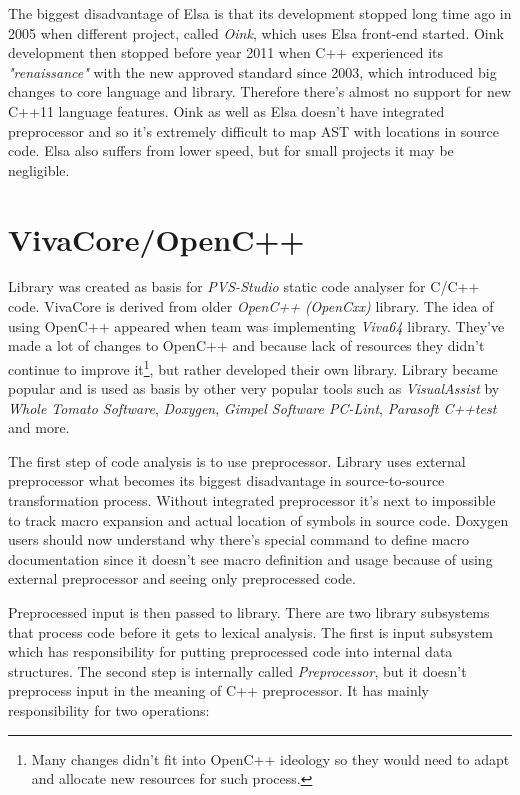 The biggest disadvantage of Elsa is that its development stopped long time ago in 2005 when different project, called \emph{Oink}, which uses Elsa front-end started. Oink development then stopped before year 2011 when C++ experienced its \textit{"renaissance"} with the new approved standard since 2003, which introduced big changes to core language and library. Therefore there's almost no support for new C++11 language features. Oink as well as Elsa doesn't have integrated preprocessor and so it's extremely difficult to map AST with locations in source code. Elsa also suffers from lower speed, but for small projects it may be negligible.

\section{VivaCore/OpenC++}
Library was created as basis for \emph{PVS-Studio} static code analyser for C/C++ code. VivaCore is derived from older \emph{OpenC++ (OpenCxx)} library. The idea of using OpenC++ appeared when team was implementing \emph{Viva64} library. They've made a lot of changes to OpenC++ and because lack of resources they didn't continue to improve it\footnote{Many changes didn't fit into OpenC++ ideology so they would need to adapt and allocate new resources for such process.}, but rather developed their own library. Library became popular and is used as basis by other very popular tools such as  \emph{VisualAssist} by \emph{Whole Tomato Software}, \emph{Doxygen}, \emph{Gimpel Software PC-Lint}, \emph{Parasoft C++test} and more.

The first step of code analysis is to use preprocessor. Library uses external preprocessor what becomes its biggest disadvantage in source-to-source transformation process. Without integrated preprocessor it's next to impossible to track macro expansion and actual location of symbols in source code. Doxygen users should now understand why there's special  command to define macro documentation since it doesn't see macro definition and usage because of using external preprocessor and seeing only preprocessed code.

Preprocessed input is then passed to library. There are two library subsystems that process code before it gets to lexical analysis. The first is input subsystem which has responsibility for putting preprocessed code into internal data structures. The second step is internally called \emph{Preprocessor}, but it doesn't preprocess input in the meaning of C++ preprocessor. It has mainly responsibility for two operations:

